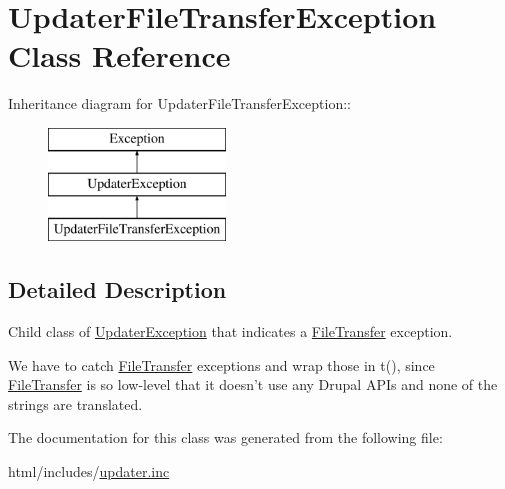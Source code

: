 \hypertarget{classUpdaterFileTransferException}{
\section{UpdaterFileTransferException Class Reference}
\label{classUpdaterFileTransferException}
}
Inheritance diagram for UpdaterFileTransferException::\begin{figure}[H]
\begin{center}
\leavevmode
\includegraphics[height=3cm]{classUpdaterFileTransferException}
\end{center}
\end{figure}


\subsection{Detailed Description}
Child class of \hyperlink{classUpdaterException}{UpdaterException} that indicates a \hyperlink{classFileTransfer}{FileTransfer} exception.

We have to catch \hyperlink{classFileTransfer}{FileTransfer} exceptions and wrap those in t(), since \hyperlink{classFileTransfer}{FileTransfer} is so low-\/level that it doesn't use any Drupal APIs and none of the strings are translated. 

The documentation for this class was generated from the following file:\begin{DoxyCompactItemize}
\item 
html/includes/\hyperlink{updater_8inc}{updater.inc}\end{DoxyCompactItemize}
